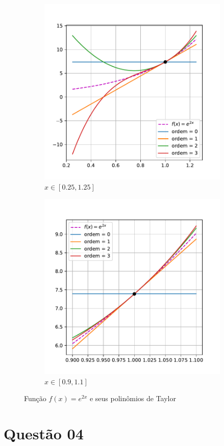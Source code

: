 \documentclass[10pt, a4paper]{article}
\begin{document}
\begin{figure}
\begin{subfigure}[b]{0.45\textwidth}
        \includegraphics[width=\textwidth]{images/q3_2.pdf}
        \caption{$x \in [0.25, 1.25]$}
        \label{fig:q3_2}
    \end{subfigure}
    \hfill
    \begin{subfigure}[b]{0.45\textwidth}
        \centering
        \includegraphics[width=\textwidth]{images/q3_3.pdf}
        \caption{$x \in [0.9, 1.1]$}
        \label{fig:q3_3}
    \end{subfigure}
       \caption{Função $f(x) = e^{2x}$ e seus polinômios de Taylor}
       \label{fig:q3}
\end{figure}

\section[q04]{Questão 04}



\end{document}
